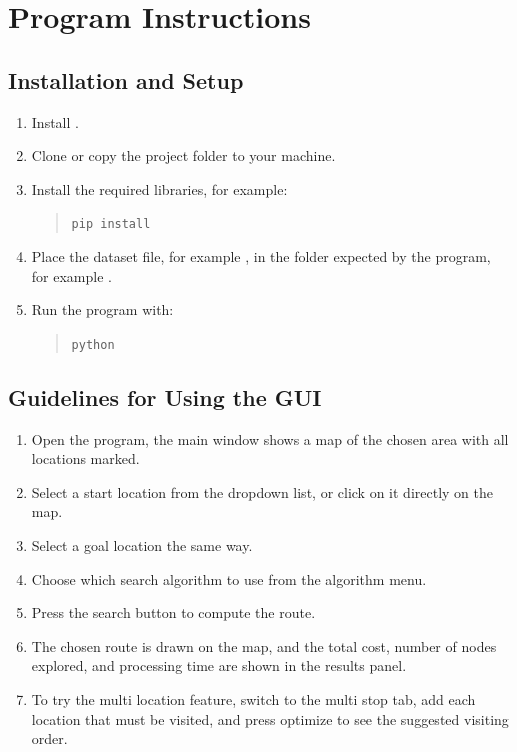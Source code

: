 \chapter{Program Instructions}
\label{chap:program-instructions}

\section{Installation and Setup}


\begin{enumerate}[itemsep=2pt]
  \item Install .
  \item Clone or copy the project folder to your machine.
  \item Install the required libraries, for example:
  \begin{quote}
  \texttt{pip install }
  \end{quote}
  \item Place the dataset file, for example , in the folder expected by the program, for example .
  \item Run the program with:
  \begin{quote}
  \texttt{python }
  \end{quote}
\end{enumerate}

\section{Guidelines for Using the GUI}


\begin{enumerate}[itemsep=2pt]
  \item Open the program, the main window shows a map of the chosen area with all locations marked.
  \item Select a start location from the dropdown list, or click on it directly on the map.
  \item Select a goal location the same way.
  \item Choose which search algorithm to use from the algorithm menu.
  \item Press the search button to compute the route.
  \item The chosen route is drawn on the map, and the total cost, number of nodes explored, and processing time are shown in the results panel.
  \item To try the multi location feature, switch to the multi stop tab, add each location that must be visited, and press optimize to see the suggested visiting order.
\end{enumerate}

